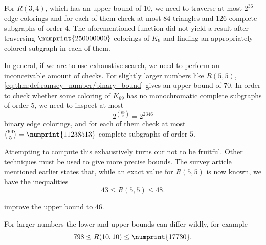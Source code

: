 \begin{remark}
  For \( R(3, 4) \), which has an upper bound of \( 10 \), we need to traverse at most \( 2^{36} \) edge colorings and for each of them check at most \( 84 \) triangles and \( 126 \) complete subgraphs of order \( 4 \). The aforementioned function did not yield a result after traversing \( \numprint{250 000 000} \) colorings of \( K_9 \) and finding an appropriately colored subgraph in each of them.

  In general, if we are to use exhaustive search, we need to perform an inconceivable amount of checks. For slightly larger numbers like \( R(5, 5) \), \eqref{eq:thm:def:ramsey_number/binary_bound} gives an upper bound of \( 70 \). In order to check whether some coloring of \( K_{69} \) has no monochromatic complete subgraphs of order \( 5 \), we need to inspect at most
  \begin{equation*}
    2^{\binom {69} 2} = 2^{2346}
  \end{equation*}
  binary edge colorings, and for each of them check at most \( \binom {69} 5 = \numprint{11 238 513} \) complete subgraphs of order \( 5 \).

  Attempting to compute this exhaustively turns our not to be fruitful. Other techniques must be used to give more precise bounds. The survey article \cite[4]{Radziszowski2021SmallRamseyNumbers} mentioned earlier states that, while an exact value for \( R(5, 5) \) is now known, we have the inequalities
  \begin{equation*}
    43 \leq R(5, 5) \leq 48.
  \end{equation*}

  \Textcite[thm. 1.1]{AngeltveitMcKay2026Ramsey5} improve the upper bound to \( 46 \).

  For larger numbers the lower and upper bounds can differ wildly, for example
  \begin{equation*}
    798 \leq R(10, 10) \leq \numprint{17 730}.
  \end{equation*}
\end{remark}
